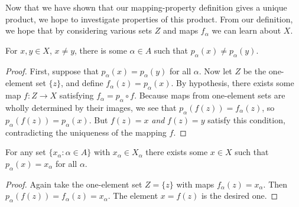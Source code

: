       Now that we have shown that our mapping-property definition gives a unique product, we hope to investigate properties of this product.
      From our definition, we hope that by considering various sets $Z$ and maps $f_\alpha$ we can learn about $X$.
      \begin{claim}
        For $x,y\in X$, $x\ne y$, there is some $\alpha\in A$ such that $p_\alpha(x)\ne p_\alpha(y)$.
        \begin{proof}
          First, suppose that $p_\alpha(x)=p_\alpha(y)$ for all $\alpha$.
          Now let $Z$ be the one-element set $\{z\}$, and define $f_\alpha(z)=p_\alpha(x)$.
          By hypothesis, there exists some map $f:Z\rightarrow X$ satisfying $f_\alpha = p_\alpha \circ f$.
          Because maps from one-element sets are wholly determined by their images, we see that $p_\alpha(f(z))=f_\alpha(z)$, so $p_\alpha(f(z))=p_\alpha(x)$.
          But $f(z)=x$ \emph{and} $f(z)=y$ satisfy this condition, contradicting the uniqueness of the mapping $f$.
        \end{proof}
      \end{claim}

      \begin{claim}
        For any set $\{x_\alpha:\alpha\in A\}$ with $x_\alpha\in X_\alpha$ there exists some $x\in X$ such that $p_\alpha(x)=x_\alpha$ for all $\alpha$.
        \begin{proof}
          Again take the one-element set $Z=\{z\}$ with maps $f_\alpha(z)=x_\alpha$.
          Then $p_\alpha(f(z))=f_\alpha(z)=x_\alpha$.
          The element $x=f(z)$ is the desired one.
        \end{proof}
      \end{claim}
      
